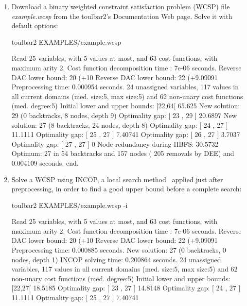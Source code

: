 \begin{enumerate}
\item Download a binary weighted constraint satisfaction problem (WCSP) file {\em example.wcsp} from the toulbar2's Documentation Web page. Solve it with default options:
\begin{DoxyCode}
	toulbar2 EXAMPLES/example.wcsp
\end{DoxyCode}
{\scriptsize
\begin{DoxyCode}
Read 25 variables, with 5 values at most, and 63 cost functions, with maximum arity 2.
Cost function decomposition time : 7e-06 seconds.
Reverse DAC lower bound: 20 (+10%
Reverse DAC lower bound: 22 (+9.09091%
Preprocessing time: 0.000954 seconds.
24 unassigned variables, 117 values in all current domains (med. size:5, max size:5) and 62 non-unary cost functions (med. degree:5)
Initial lower and upper bounds: [22,64[ 65.625%
New solution: 29 (0 backtracks, 8 nodes, depth 9)
Optimality gap: [ 23 , 29 ] 20.6897 %
New solution: 27 (8 backtracks, 24 nodes, depth 8)
Optimality gap: [ 24 , 27 ] 11.1111 %
Optimality gap: [ 25 , 27 ] 7.40741 %
Optimality gap: [ 26 , 27 ] 3.7037 %
Optimality gap: [ 27 , 27 ] 0 %
Node redundancy during HBFS: 30.5732 %
Optimum: 27 in 54 backtracks and 157 nodes ( 205 removals by DEE) and 0.004109 seconds.
end.
\end{DoxyCode}}
\item Solve a WCSP using INCOP, a local search method~\cite{idwalk:cp04} applied just after preprocessing, in order to find a good upper bound before a complete search:
\begin{DoxyCode}
	toulbar2 EXAMPLES/example.wcsp -i
\end{DoxyCode}
{\scriptsize
\begin{DoxyCode}
Read 25 variables, with 5 values at most, and 63 cost functions, with maximum arity 2.
Cost function decomposition time : 7e-06 seconds.
Reverse DAC lower bound: 20 (+10%
Reverse DAC lower bound: 22 (+9.09091%
Preprocessing time: 0.000885 seconds.
New solution: 27 (0 backtracks, 0 nodes, depth 1)
INCOP solving time: 0.200864 seconds.
24 unassigned variables, 117 values in all current domains (med. size:5, max size:5) and 62 non-unary cost functions (med. degree:5)
Initial lower and upper bounds: [22,27[ 18.5185%
Optimality gap: [ 23 , 27 ] 14.8148 %
Optimality gap: [ 24 , 27 ] 11.1111 %
Optimality gap: [ 25 , 27 ] 7.40741 %

\end{DoxyCode}}
\end{enumerate}
